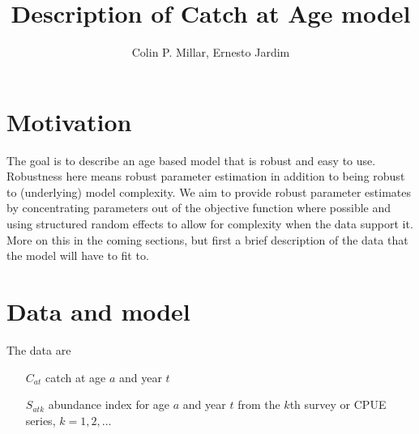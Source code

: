 \documentclass[a4paper,english]{article}
\begin{document}
\newcommand{\bm}[1]{\mbox{\boldmath $#1$}}
\newcommand{\half}{\frac{1}{2}}
\newcommand{\Ev}[1]{\text{E}\left[ #1 \right]}
\newcommand{\Prec}[1]{\text{Prec}\left[ #1 \right]}
\newcommand{\iid}{\stackrel{\mathrm{iid}}{\sim}}
\newcommand{\T}{^\mathsf{T}}
\newcommand{\Det}[1]{\begin{vmatrix} #1 \end{vmatrix}}
\newcommand{\pdif}[2]{\frac{\partial #1}{\partial #2}}
\newcommand{\pddif}[2]{\frac{\partial^2 #1}{\partial #2^2}}
\newcommand{\pddiff}[3]{\frac{\partial^2 #1}{\partial #2 \partial #3}}



\title{Description of Catch at Age model}
\author{Colin P. Millar, Ernesto Jardim}
\date{}
\maketitle

\section{Motivation}

The goal is to describe an age based model that is robust and easy to use.  Robustness here means robust parameter estimation in addition to being robust to (underlying) model complexity.  We aim to provide robust parameter estimates by concentrating parameters out of the objective function where possible and using structured random effects to allow for complexity when the data support it.  More on this in the coming sections, but first a brief description of the data that the model will have to fit to.

\section{Data and model}

The data are
\begin{itemize}
  \item[$C_{at}$] catch at age $a$ and year $t$
  \item[$S_{atk}$] abundance index for age $a$ and year $t$ from the $k$th survey or CPUE series, $k = 1, 2, \ldots$
\end{itemize}
  
\end{document}
